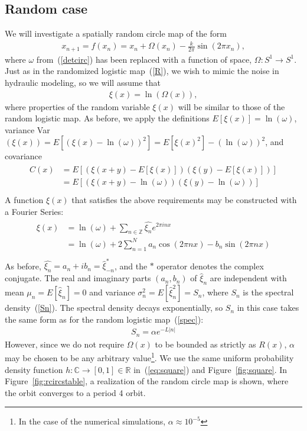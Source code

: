\subsection{Random case}
We will investigate a spatially random circle map of the form
\begin{align}\label{randcirc}
x_{n+1}= f(x_n) =  x_n + \Omega(x_n) - \frac{k}{2\pi}\sin(2\pi x_n),
\end{align}
where $\omega$ from~(\ref{detcirc}) has been replaced with a function
of space, $\Omega:S^1\to S^1$. Just as in the randomized logistic
map~(\ref{R}), we wish to mimic the noise in hydraulic modeling, so we
will assume that
\begin{align}\label{Omega}
\xi(x) = \ln(\Omega(x)),
\end{align}
where properties of the random variable $\xi(x)$ will be similar to
those of the random logistic map. As before, we apply the definitions $E[\xi(x)] =
\ln(\omega)$, variance Var$(\xi(x))=E[(\xi(x) -
\ln(\omega))^2]=E[\xi(x)^2]-(\ln(\omega))^2$, and covariance
\begin{align}
\begin{split}\label{cor_circ}
C(x) &=E[(\xi(x+y) - E[\xi(x)])(\xi(y)-E[\xi(x)])] \\
&= E[(\xi(x+y) -\ln(\omega))(\xi(y)-\ln(\omega))] \\
\end{split}
\end{align}
A function $\xi(x)$ that satisfies the above requirements may be
constructed with a Fourier Series:
\begin{align}\label{fs_circ}
\begin{split}
\xi(x) &= \ln(\omega) + \sum_{n \in \mathbb{Z}}\hat{\xi_n}e^{2\pi inx}\\
&= \ln(\omega) + 2\sum^N_{n=1}a_n\cos(2\pi nx)-b_n\sin(2\pi nx)\\
\end{split}
\end{align}
As before, $\hat{\xi_n} = a_n + ib_n = \hat{\xi}_{-n}^*$, and the $*$
operator denotes the complex conjugate. The real and imaginary parts
$(a_n,b_n)$ of $\hat{\xi}_n$ are independent with mean
$\mu_n=E[\hat{\xi}_n]=0$ and variance $\sigma_n^2=E[\hat{\xi}_n^2]=S_n$,
where $S_n$ is the spectral density~(\ref{Sn}). The
spectral density decays exponentially, so $S_n$ in this case
takes the same form as for the random logistic map~(\ref{spec}):
\begin{align*}
S_n=\alpha e^{-L|n|}
\end{align*}
However, since we do not require $\Omega(x)$ to be bounded as strictly
as $R(x)$, $\alpha$ may be chosen to be any arbitrary
value\footnote{In the case of the numerical simulations, $\alpha
  \approx 10^{-5}$}. We use the same uniform probability density
function $h:\mathbb{C}\to [0,1]\in \mathbb{R}$ in~(\ref{eq:square})
and Figure~\ref{fig:square}. In Figure~\ref{fig:rcircstable}, a realization of the
random circle map is shown, where the orbit converges to a period 4 orbit.

